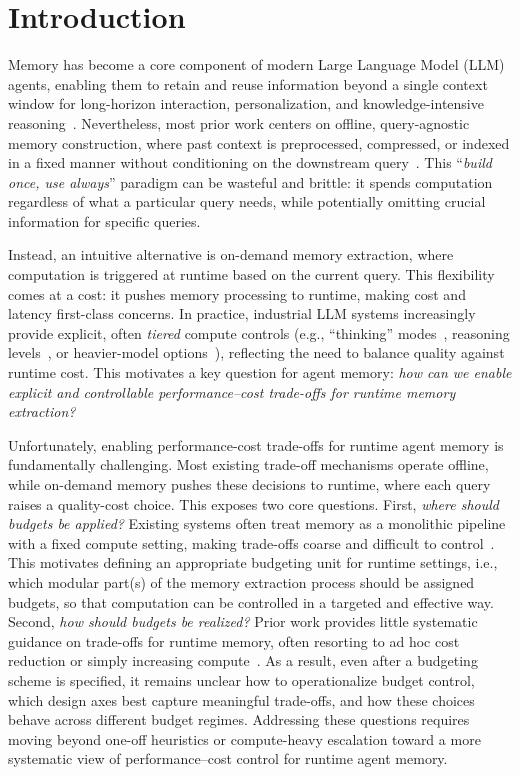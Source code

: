 \section{Introduction}
\label{sec:intro}


Memory has become a core component of modern Large Language Model (LLM) agents, enabling them to retain and reuse information beyond a single context window for long-horizon interaction, personalization, and knowledge-intensive reasoning~\citep{hu2025memory}. 
Nevertheless, most prior work centers on offline, query-agnostic memory construction, where past context is preprocessed, compressed, or indexed in a fixed manner without conditioning on the downstream query~\citep{kang2025memory, fang2025lightmem, zhong2024memorybank, xu2025mem, packer2023memgpt, chhikara2025mem0}.
This ``\textit{build once, use always}'' paradigm can be wasteful and brittle: it spends computation regardless of what a particular query needs, while potentially omitting crucial information for specific queries.




Instead, an intuitive alternative is on-demand memory extraction, where computation is triggered at runtime based on the current query.
This flexibility comes at a cost: it pushes memory processing to runtime, making cost and latency first-class concerns.
In practice, industrial LLM systems increasingly provide explicit, often \textit{tiered} compute controls (e.g., ``thinking'' modes~\citep{singh2025openai}, reasoning levels~\citep{openai-codex}, or heavier-model options~\citep{claude-code}), reflecting the need to balance quality against runtime cost.
This motivates a key question for agent memory: \textit{how can we enable explicit and controllable performance–cost trade-offs for runtime memory extraction?}



Unfortunately, enabling performance-cost trade-offs for runtime agent memory is fundamentally challenging. Most existing trade-off mechanisms operate offline, while on-demand memory pushes these decisions to runtime, where each query raises a quality-cost choice. This exposes two core questions.
First, \textit{where should budgets be applied?} Existing systems often treat memory as a monolithic pipeline with a fixed compute setting, making trade-offs coarse and difficult to control~\citep{kang2025memory, zhong2024memorybank}. 
This motivates defining an appropriate budgeting unit for runtime settings, i.e., which modular part(s) of the memory extraction process should be assigned budgets, so that computation can be controlled in a targeted and effective way.
Second, \textit{how should budgets be realized?} Prior work provides little systematic guidance on trade-offs for runtime memory, often resorting to ad hoc cost reduction or simply increasing compute~\citep{yan2025general}. As a result, even after a budgeting scheme is specified, it remains unclear how to operationalize budget control, which design axes best capture meaningful trade-offs, and how these choices behave across different budget regimes.
Addressing these questions requires moving beyond one-off heuristics or compute-heavy escalation toward a more systematic view of performance–cost control for runtime agent memory.


